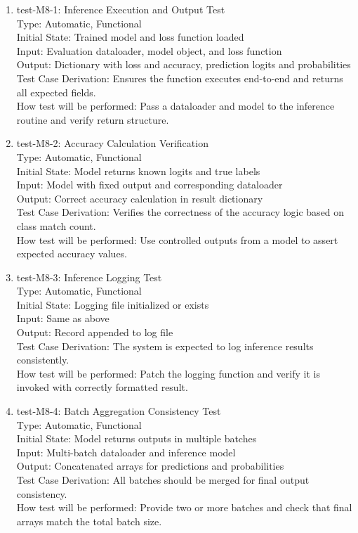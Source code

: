 \documentclass[12pt, titlepage]{article}
\begin{document}
\begin{enumerate}

\item{test-M8-1: Inference Execution and Output Test\\}
Type: Automatic, Functional \\
Initial State: Trained model and loss function loaded \\
Input: Evaluation dataloader, model object, and loss function \\
Output: Dictionary with loss and accuracy, prediction logits and probabilities \\
Test Case Derivation: Ensures the function executes end-to-end and returns all expected fields. \\
How test will be performed: Pass a dataloader and model to the inference routine and verify return structure.

\item{test-M8-2: Accuracy Calculation Verification\\}
Type: Automatic, Functional \\
Initial State: Model returns known logits and true labels \\
Input: Model with fixed output and corresponding dataloader \\
Output: Correct accuracy calculation in result dictionary \\
Test Case Derivation: Verifies the correctness of the accuracy logic based on class match count. \\
How test will be performed: Use controlled outputs from a model to assert expected accuracy values.

\item{test-M8-3: Inference Logging Test\\}
Type: Automatic, Functional \\
Initial State: Logging file initialized or exists \\
Input: Same as above \\
Output: Record appended to log file \\
Test Case Derivation: The system is expected to log inference results consistently. \\
How test will be performed: Patch the logging function and verify it is invoked with correctly formatted result.

\item{test-M8-4: Batch Aggregation Consistency Test\\}
Type: Automatic, Functional \\
Initial State: Model returns outputs in multiple batches \\
Input: Multi-batch dataloader and inference model \\
Output: Concatenated arrays for predictions and probabilities \\
Test Case Derivation: All batches should be merged for final output consistency. \\
How test will be performed: Provide two or more batches and check that final arrays match the total batch size.

\end{enumerate}
\end{document}
